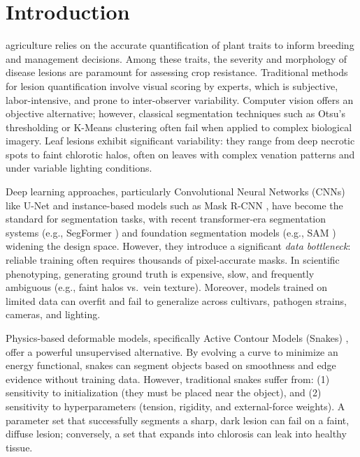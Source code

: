 \documentclass[journal]{IEEEtran}
\begin{document}
\section{Introduction}
 agriculture relies on the accurate quantification of plant traits to inform breeding and management decisions. Among these traits, the severity and morphology of disease lesions are paramount for assessing crop resistance. Traditional methods for lesion quantification involve visual scoring by experts, which is subjective, labor-intensive, and prone to inter-observer variability. Computer vision offers an objective alternative; however, classical segmentation techniques such as Otsu's thresholding or K-Means clustering often fail when applied to complex biological imagery. Leaf lesions exhibit significant variability: they range from deep necrotic spots to faint chlorotic halos, often on leaves with complex venation patterns and under variable lighting conditions.

Deep learning approaches, particularly Convolutional Neural Networks (CNNs) like U-Net \cite{ronneberger2015u} and instance-based models such as Mask R-CNN \cite{he2017mask}, have become the standard for segmentation tasks, with recent transformer-era segmentation systems (e.g., SegFormer \cite{xie2021segformer}) and foundation segmentation models (e.g., SAM \cite{kirillov2023segment}) widening the design space. However, they introduce a significant \emph{data bottleneck}: reliable training often requires thousands of pixel-accurate masks. In scientific phenotyping, generating ground truth is expensive, slow, and frequently ambiguous (e.g., faint halos vs.\ vein texture). Moreover, models trained on limited data can overfit and fail to generalize across cultivars, pathogen strains, cameras, and lighting.

Physics-based deformable models, specifically Active Contour Models (Snakes) \cite{kass1988snakes}, offer a powerful unsupervised alternative. By evolving a curve to minimize an energy functional, snakes can segment objects based on smoothness and edge evidence without training data. However, traditional snakes suffer from: (1) sensitivity to initialization (they must be placed near the object), and (2) sensitivity to hyperparameters (tension, rigidity, and external-force weights). A parameter set that successfully segments a sharp, dark lesion can fail on a faint, diffuse lesion; conversely, a set that expands into chlorosis can leak into healthy tissue.
\end{document}
